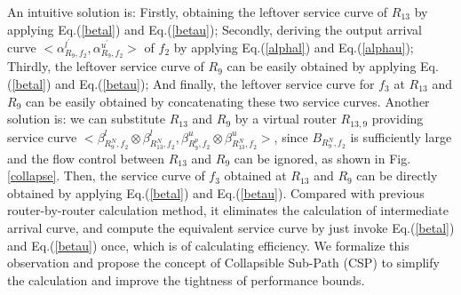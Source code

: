 \documentclass[10pt,journal]{IEEEtran}
\begin{document}
An intuitive solution is: Firstly, obtaining the leftover service curve of $R_{13}$ by applying Eq.(\ref{betal}) and Eq.(\ref{betau}); Secondly, deriving the output arrival curve $<\alpha_{R_{9},f_2}^{l^\prime},\alpha_{R_{9},f_2}^{u^\prime}>$ of $f_2$ by applying Eq.(\ref{alphal}) and Eq.(\ref{alphau}); Thirdly, the leftover service curve of $R_9$ can be easily obtained by applying Eq.(\ref{betal}) and Eq.(\ref{betau}); And finally, the leftover service curve for $f_3$ at $R_{13}$ and $R_9$ can be easily obtained by concatenating these two service curves. Another solution is: we can substitute $R_{13}$ and $R_{9}$ by a virtual router $R_{13,9}$ providing service curve $<\beta_{R_{9}^N,f_2}^l\otimes\beta_{R_{13}^N,f_2}^l,\beta_{R_{9}^{p},f_2}^u\otimes\beta_{R_{13}^N,f_2}^u>$, since $B_{R_9^N,f_2}$ is sufficiently large and the flow control between $R_{13}$ and $R_9$ can be ignored, as shown in Fig. \ref{collapse}. Then, the service curve of $f_3$ obtained at $R_{13}$ and $R_{9}$ can be directly obtained by applying Eq.(\ref{betal}) and Eq.(\ref{betau}). Compared with previous router-by-router calculation method, it eliminates the calculation of intermediate arrival curve, and compute the equivalent service curve by just invoke Eq.(\ref{betal}) and Eq.(\ref{betau}) once, which is of calculating efficiency. We formalize this observation and propose the concept of Collapsible Sub-Path (CSP) to simplify the calculation and improve the tightness of performance bounds.
\end{document}

